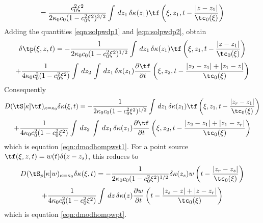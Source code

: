 \begin{equation}
  \label{eqn:solpwdp2}
=\frac{c_0^2\xi^2}{2\kappa_0c_0(1-c_0^2\xi^2)^{3/2}}\int \,dz_1\, \delta 
\kappa(z_1) \tf \left(\xi,z_1,t - \frac{|z-z_1|}{\tc_0(\xi)}\right)
\end{equation}
Adding the quantities \ref{eqn:solpwdp1} and \ref{eqn:solpwdp2},
obtain
\[
  \delta \tp(\xi,z,t) = -\frac{1}{2\kappa_0c_0(1-c_0^2\xi^2)^{1/2}}\int \,dz_1\, \delta 
  \kappa(z_1) \tf \left(\xi,z_1,t - \frac{|z-z_1|}{\tc_0(\xi)}\right)
  \]
\begin{equation}
  \label{eqn:solpwdp}
  + \frac{1}{4\kappa_0c_0^2(1-c_0^2\xi^2)} \int\,dz_2 \, \int \,dz_1\,\delta 
  \kappa(z_1)  \frac{\partial \tf}{\partial
    t}\left(\xi,z_2,t - \frac{|z_2-z_1|+|z_1-z|}{\tc_0(\xi)}\right)
  \end{equation}
Consequently 
\[
  D(\tS[\kappa]\tf)_{\kappa=\kappa_0}\delta \kappa(\xi,t) =
  -\frac{1}{2\kappa_0c_0(1-c_0^2\xi^2)^{1/2}}\int \,dz_1\, \delta 
  \kappa(z_1) \tf \left(\xi,z_1,t - \frac{|z_r-z_1|}{\tc_0(\xi)}\right)
\]
\begin{equation}
  \label{eqn:dmodhomst1app}
    + \frac{1}{4\kappa_0c_0^2(1-c_0^2\xi^2)} \int\,dz_2 \, \int \,dz_1\,\delta 
  \kappa(z_1)  \frac{\partial \tf}{\partial
    t}\left(\xi,z_2,t - \frac{|z_2-z_1|+|z_1-z_r|}{\tc_0(\xi)}\right)
\end{equation}
which is equation \ref{eqn:dmodhompwst1}. For a point source
$\tf(\xi,z,t) = w(t)\delta(z-z_s)$, this reduces to
\[
  D(\tS_p[\kappa]w)_{\kappa=\kappa_0}\delta \kappa(\xi,t) =
  -\frac{1}{2\kappa_0c_0(1-c_0^2\xi^2)^{1/2}} \delta 
  \kappa(z_s) w\left(t - \frac{|z_r-z_s|}{\tc_0(\xi)}\right)
\]
\begin{equation}
  \label{eqn:dmodhompt1}
    + \frac{1}{4\kappa_0c_0^2(1-c_0^2\xi^2)} \int \,dz\,\delta 
  \kappa(z) \frac{\partial w}{\partial
    t}\left(t - \frac{|z_s-z|+|z-z_r|}{\tc_0(\xi)}\right)
\end{equation}
which is equation \ref{eqn:dmodhompwpt}. 



